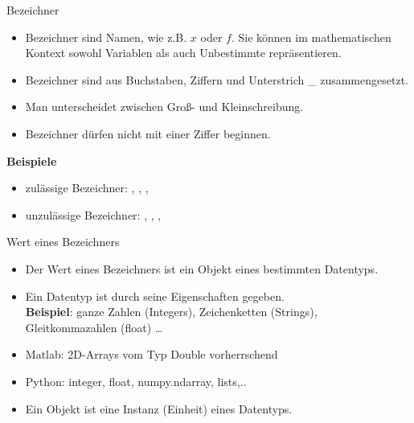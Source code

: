 \documentclass[hyperref={xetex}]{beamer}
\begin{document}
\begin{frame}[fragile]{Bezeichner}
\begin{itemize}
\item \alert{Bezeichner} sind Namen, wie z.B. $x$ oder $f$. Sie können
im mathematischen Kontext sowohl Variablen als auch Unbestimmte repräsentieren.
\item Bezeichner sind aus Buchstaben, Ziffern und
Unterstrich \_ zusammengesetzt.
\item Man unterscheidet zwischen Groß- und Kleinschreibung.
\item Bezeichner dürfen nicht mit einer Ziffer beginnen.
\end{itemize}
\textbf{Beispiele}
\begin{itemize}
\item zulässige Bezeichner:
, , , 
\item unzulässige Bezeichner:
, , , 
\end{itemize}
\end{frame}
\begin{frame}[fragile]{Wert eines Bezeichners}
\begin{itemize}
\item Der \alert{Wert} eines Bezeichners  ist ein \alert{Objekt} eines bestimmten
\alert{Datentyps}.
\item Ein \alert{Datentyp} ist durch seine Eigenschaften gegeben. \\
\textbf{Beispiel}: ganze Zahlen (Integers), Zeichenketten (Strings), Gleitkommazahlen (float) \ldots  
\item Matlab: 2D-Arrays vom Typ Double vorherrschend
\item Python: integer, float, numpy.ndarray, lists,..
\item Ein \alert{Objekt} ist eine Instanz (Einheit) eines Datentyps.
\end{itemize}
\end{frame}
\end{document}
